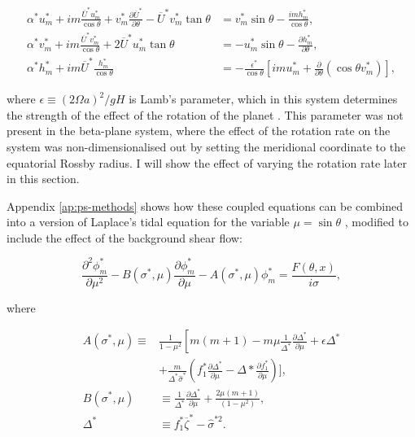 \begin{equation}\label{spherical-sw-eqns-nondim}
  \begin{aligned}
    \alpha^{*} u_{m}^{*}+i m \frac{\overline{U}^{*} u_{m}^{*}}{\cos \theta}+v_{m}^{*} \frac{\partial \overline{U}^{*}}{\partial \theta}-\overline{U}^{*} v_{m}^{*} \tan \theta &=v_{m}^{*} \sin \theta-\frac{i m h_{m}^{*}}{\cos \theta}, \\
    \alpha^{*} v_{m}^{*}+i m \frac{\overline{U}^{*} v_{m}^{*}}{\cos \theta}+2 \overline{U}^{*} u_{m}^{*} \tan \theta &=-u_{m}^{*} \sin \theta-\frac{\partial h_{m}^{*}}{\partial \theta}, \\
    \alpha^{*} h_{m}^{*}+i m \overline{U}^{*} \frac{h_{m}^{*}}{\cos \theta} &=-\frac{\epsilon^{*}}{\cos \theta}\left[i m u_{m}^{*}+\frac{\partial}{\partial \theta}\left(\cos \theta v_{m}^{*}\right)\right],
  \end{aligned}
\end{equation}

where $\epsilon \equiv(2 \Omega a)^{2} / g H$ is Lamb's parameter, which in this system determines the strength of the effect of the rotation of the planet \citep{longuet1968tidal}. This parameter was not present in the beta-plane system, where the effect of the rotation rate on the system was non-dimensionalised out by setting the meridional coordinate to the equatorial Rossby radius. I will show the effect of varying the rotation rate later in this section.

Appendix \ref{ap:ps-methods} shows how these coupled equations can be combined into a version of Laplace's tidal equation for the variable $\mu = \sin \theta$ \citep{dunkerton1990laplace}, modified to include the effect of the background shear flow:

\begin{equation}\label{eqn:tidal-eqn-U}
  \frac{\partial^{2} \phi_{m}^{*}}{\partial \mu^{2}}-B\left(\sigma^{*}, \mu\right) \frac{\partial \phi_{m}^{*}}{\partial \mu}-A\left(\sigma^{*}, \mu\right) \phi_{m}^{*}=\frac{F(\theta,x)}{i \sigma},
\end{equation}

where

\begin{equation}
  \begin{aligned} A\left(\sigma^{*}, \mu\right) \equiv & \frac{1}{1-\mu^{2}}\left[m(m+1)-m \mu \frac{1}{\Delta^{*}} \frac{\partial \Delta^{*}}{\partial \mu}+\epsilon \Delta^{*}\right.\\
  &+\frac{m}{\Delta^{*} \hat{\sigma}^{*}}\left(f_{1}^{*} \frac{\partial \Delta^{*}}{\partial \mu}-\Delta * \frac{\partial f_{1}^{*}}{\partial \mu}\right) ], \\
  B\left(\sigma^{*}, \mu\right) & \equiv \frac{1}{\Delta^{*}} \frac{\partial \Delta^{*}}{\partial \mu}+\frac{2 \mu(m+1)}{\left(1-\mu^{2}\right)}, \\ \Delta^{*} & \equiv f_{1}^{*} \overline{\zeta}^{*}-\hat{\sigma}^{* 2}.
 \end{aligned}
\end{equation}

